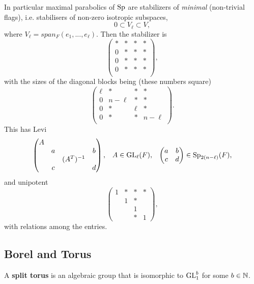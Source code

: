     \label{maximal_parabolic}
    In particular maximal parabolics of \(\operatorname{Sp}\) are stabilizers of \textit{minimal} (non-trivial flags), i.e. stabilisers of non-zero isotropic subspaces,
    \[0 \subset V_\ell \subset V,\]
    where \(V_\ell = span_F(e_1, ..., e_\ell)\). Then the stabilizer is 
    \[\begin{pmatrix}
        * &*&*&* \\
        0 &*&*&* \\
        0 &*&*&* \\
        0 &*&*&* \\
    \end{pmatrix},\]
    with the sizes of the diagonal blocks being (these numbers square)
    \[\begin{pmatrix}
        \ell &*&*&* \\
        0 &n-\ell&*&* \\
        0 &*&\ell&* \\
        0 &*&*&n-\ell \\
    \end{pmatrix}.\]
    This has Levi
    \[\begin{pmatrix}
        A &&& \\
         &a&&b \\
         &&(A^T)^{-1}& \\
         &c&&d \\
    \end{pmatrix}, \;\;\; A\in \operatorname{GL}_\ell(F), \;\;\; \begin{pmatrix}
        a & b\\
        c & d \\
    \end{pmatrix} \in \operatorname{Sp}_{2(n-\ell)}(F),\]
    and unipotent 
    \[\begin{pmatrix}
        1 &*&*&* \\
        & 1&*& \\
        && 1& \\
        &&*&1
    \end{pmatrix},\]
    with relations among the entries.

    \subsection{Borel and Torus}\label{borel_torus}    
    A \textbf{split torus} is an algebraic group that is isomorphic to \(\operatorname{GL}_1^b\) for some \(b\in\N\).

